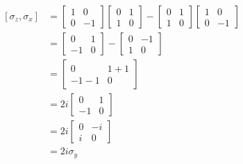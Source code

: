 \documentclass{article}
\begin{document}
\begin{align*}
    \begin{split}
    [\sigma_z, \sigma_x] &=
    \begin{bmatrix}
        1 & 0 \\
        0 & -1
    \end{bmatrix}
    \begin{bmatrix}
        0 & 1 \\
        1 & 0
    \end{bmatrix}
    - \begin{bmatrix}
        0 & 1 \\
        1 & 0
    \end{bmatrix}
    \begin{bmatrix}
        1 & 0 \\
        0 & -1
    \end{bmatrix} \\
    &= 
    \begin{bmatrix}
        0 & 1 \\
        -1 & 0
    \end{bmatrix}
    - \begin{bmatrix}
        0 & -1\\
        1 & 0
    \end{bmatrix} \\
    &= \begin{bmatrix}
        0 & 1 + 1 \\
        -1 - 1 & 0
    \end{bmatrix} \\
    &= 2i \begin{bmatrix}
        0 & 1 \\
        -1 & 0
    \end{bmatrix} \\
    &= 2i \begin{bmatrix}
        0 & -i \\   
        i & 0
    \end{bmatrix} \\
    &= 2i\sigma_y \\
    \end{split}
\end{align*}
\end{document}
